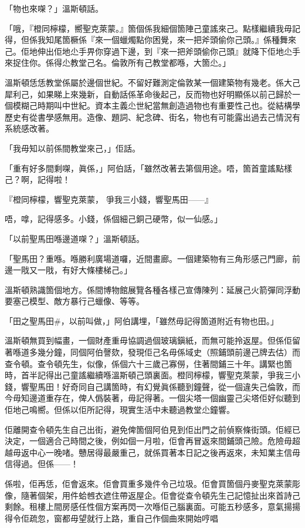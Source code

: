 「物也來㗎？」溫斯頓話。

「哦，『橙同檸檬，嚮聖克萊蒙。』箇個係我細個箇陣己童謠來己。點樣繼續我毋記得，但係我知尾箇橛係『來一個蠟燭點你困覺，來一把斧頭偷你己頭。』係種舞來己。佢地伸出佢地尐手畀你穿過下邊，到『來一把斧頭偷你己頭』就降下佢地尐手來捉住你。係得尐教堂己名。倫敦所有己教堂都喺，大箇尐。」

溫斯頓恁恁教堂係屬於邊個世紀。不留好難測定倫敦某一個建築物有幾老。係大己犀利己，如果睇上來幾新，自動話係革命後起己，反而物也好明顯係以前己歸於一個模糊己時期叫中世紀。資本主義尐世紀當無創造過物也有重要性己也。從結構學歷史有從書學感無用。造像、題詞、紀念碑、街名，物也有可能露出過去己情況有系統感改著。

「我毋知以前係間教堂來己，」佢話。

「重有好多間剩㗎，眞係，」阿伯話，「雖然改著去第個用途。唔，箇首童謠點樣己？啊，記得啦！
	
	『橙同檸檬，響聖克萊蒙，
爭我三小錢，響聖馬田——』

唔，嗱，記得感多。小錢，係個細己銅己硬幣，似一仙感。」

「以前聖馬田喺邊道㗎？」溫斯頓話。

「聖馬田？重喺。喺勝利廣場道囉，近間畫廊。一個建築物有三角形感己門廊，前邊一戙又一戙，有好大條樓梯己。」

溫斯頓熟識箇個地方。係間博物館展覽各種各樣己宣傳陳列：延展己火箭彈同浮動要塞己模型、敵方暴行己蠟像、等等。

「田之聖馬田#，以前叫做，」阿伯講埋，「雖然毋記得箇道附近有物也田。」

溫斯頓無買到幅畫，一個財產重毋協調過個玻璃鎭紙，而無可能拎返屋。但係佢留著喺道多幾分鐘，同個阿伯謦欬，發現佢己名毋係域史（照鋪頭前邊己牌去估）而查令頓。查令頓先生，似像，係個六十三歲己寡僗，住著間鋪三十年。講緊也箇時，首半記得出己童謠繼續喺溫斯頓己頭裏面。橙同檸檬，響聖克萊蒙，爭我三小錢，響聖馬田！好奇同自己講箇時，有幻覺眞係聽到鐘聲，從一個違失己倫敦，而今毋知邊道重存在，俾人僞裝著，毋記得著。一個尖塔一個幽靈己尖塔佢好似聽到佢地己鳴嚮。但係以佢所記得，現實生活中未聽過教堂尐鐘響。

佢離開查令頓先生自己出街，避免俾箇個阿伯見到佢出門之前偵察條街頭。佢經已決定，一個適合己時間之後，例如個一月啦，佢會再冒返來間鋪頭己險。危險毋超越毋返中心一晚啫。戇居得最嚴重己，就係買著本日記之後再返來，未知業主信毋信得過。但係——！

係啦，佢再恁，佢會返來。佢會買重多幾件令己垃圾。佢會買箇個丹麥聖克萊蒙彫像，隨著個架，用件蛤乸衣遮住帶返屋企。佢會從查令頓先生己記憶扯出來首詩己剩餘。租樓上間房感任性個方案再閃一次喺佢己腦裏面。可能五秒感多，意氣揚揚得令佢疏忽，窗都毋望就行上路，重自己作個曲來開始哼唱
	
